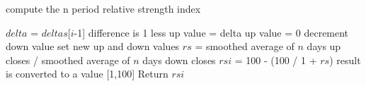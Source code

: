 \documentclass{article}
\begin{document}
	\begin{algorithm}
		\caption{compute the n period relative strength index}
		\label{rsi}
		\begin{algorithmic}[1]
				\State $delta$ = $deltas$[$i$-1]
				\Comment difference is 1 less
					\State up value = delta
				\Else
					\State up value = 0
					\State decrement down value
				\EndIf
				\State set new up and down values
				\State $rs$ = smoothed average of $n$ days up closes / smoothed average of $n$ days down closes
				\State $rsi$ = 100 - (100 / 1 + $rs$)
				\Comment result is converted to a value [1,100]
			\EndFor
			\State Return $rsi$
			\EndProcedure
		\end{algorithmic}
	\end{algorithm}
\end{document}
